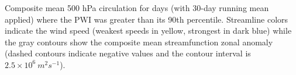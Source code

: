 \label{fig:pwi_spatial_summary}
Composite mean 500 hPa circulation for days (with 30-day running mean applied) where the PWI was greater than its 90th percentile. Streamline colors indicate the wind speed (weakest speeds in yellow, strongest in dark blue) while the gray contours show the composite mean streamfunction zonal anomaly (dashed contours indicate negative values and the contour interval is $2.5 \times 10^6 \: m^2 s^{-1}$). 